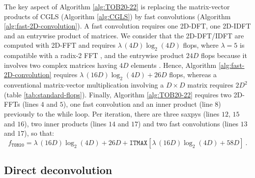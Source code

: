 The key aspect of Algorithm \ref{alg:TOB20-22} is replacing the matrix-vector products of CGLS (Algorithm \ref{alg:CGLS})
by fast convolutions (Algorithm \ref{alg:fast-2D-convolution}).
A fast convolution requires one 2D-DFT, one 2D-IDFT and an entrywise product of matrices.
We consider that the 2D-DFT/IDFT are computed with 2D-FFT and requires $\lambda \, (4D)\log_{2}(4D)$ flops, 
where $\lambda = 5$ is compatible with a radix-2 FFT 
\citep[][p. 16]{vanloan1992}, and the entrywise product $24D$ flops because it involves two complex matrices having $4D$ elements
\citep[][p. 36]{golub-vanloan2013}.
Hence, Algorithm \ref{alg:fast-2D-convolution} requires $\lambda \, (16D)\log_{2}(4D) + 26D$ flops,
whereas a conventional matrix-vector multiplication involving a $D \times D$ matrix requires $2D^{2}$ (table \ref{tab:standard-flops}).
Finally, Algorithm \ref{alg:TOB20-22} requires two 2D-FFTs (lines $4$ and $5$), one fast convolution and an inner product (line $8$)
previously to the while loop.
Per iteration, there are three saxpys (lines $12$, $15$ and $16$), two inner products (lines $14$ and $17$) and 
two fast convolutions (lines $13$ and $17$), so that:
\begin{equation}
	f_{\mathtt{TOB20}} = \lambda \, (16D)\log_{2}(4D) + 26D + \mathtt{ITMAX} 
	\left[
	\lambda \, (16D)\log_{2}(4D) + 58D
	\right] \: .
	\label{flops:TOB20}
\end{equation}

\subsection{Direct deconvolution}

